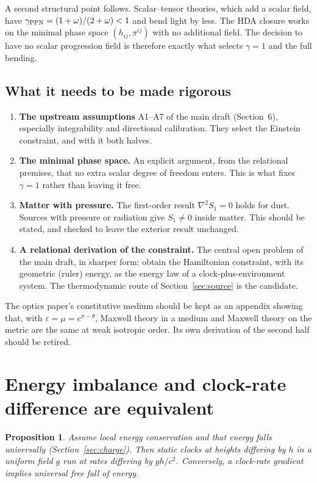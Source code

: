 \documentclass[11pt]{article}
\newcommand{\thP}{\theta}
\newcommand{\sgP}{\sigma}
\theoremstyle{plain}
\newtheorem{proposition}{Proposition}
\theoremstyle{remark}
\begin{document}
A second structural point follows. Scalar--tensor theories, which add a scalar field, have $\gamma_{\rm PPN}=(1+\omega)/(2+\omega)<1$ and bend light by less. The HDA closure works on the minimal phase space $(h_{ij},\pi^{ij})$ with no additional field. The decision to have no scalar progression field is therefore exactly what selects $\gamma=1$ and the full bending.

\subsection{What it needs to be made rigorous}

\begin{enumerate}[1.]
\item \textbf{The upstream assumptions} A1--A7 of the main draft (Section~6), especially integrability and directional calibration. They select the Einstein constraint, and with it both halves.
\item \textbf{The minimal phase space.} An explicit argument, from the relational premises, that no extra scalar degree of freedom enters. This is what fixes $\gamma=1$ rather than leaving it free.
\item \textbf{Matter with pressure.} The first-order result $\nabla^2S_1=0$ holds for dust. Sources with pressure or radiation give $S_1\neq0$ inside matter. This should be stated, and checked to leave the exterior result unchanged.
\item \textbf{A relational derivation of the constraint.} The central open problem of the main draft, in sharper form: obtain the Hamiltonian constraint, with its geometric (ruler) energy, as the energy law of a clock-plus-environment system. The thermodynamic route of Section~\ref{sec:source} is the candidate.
\end{enumerate}

The optics paper's constitutive medium should be kept as an appendix showing that, with $\varepsilon=\mu=e^{\sgP-\thP}$, Maxwell theory in a medium and Maxwell theory on the metric are the same at weak isotropic order. Its own derivation of the second half should be retired.

\section{Energy imbalance and clock-rate difference are equivalent}
\label{sec:equivalence}

\begin{proposition}
Assume local energy conservation and that energy falls universally (Section~\ref{sec:charge}). Then static clocks at heights differing by $h$ in a uniform field $g$ run at rates differing by $gh/c^2$. Conversely, a clock-rate gradient implies universal free fall of energy.
\end{proposition}
\end{document}
